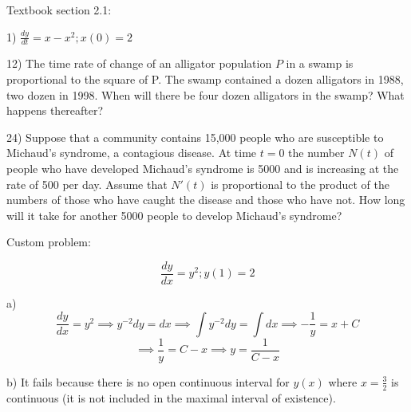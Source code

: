 \documentclass{article}
\begin{document}
Textbook section 2.1:

1) $\frac{dy}{dt} = x - x^2; x(0) = 2$

12) The time rate of change of an alligator population $P$
in a swamp is proportional to the square of P. The swamp
contained a dozen alligators in 1988, two dozen in 1998.
When will there be four dozen alligators in the swamp?
What happens thereafter?

24) Suppose that a community contains 15,000 people who are
susceptible to Michaud's syndrome, a contagious disease. At
time $t = 0$ the number $N(t)$ of people who have developed
Michaud's syndrome is 5000 and is increasing at the rate of 500
per day. Assume that $N'(t)$ is proportional to the product
of the numbers of those who have caught the disease and those
who have not. How long will it take for another 5000
people to develop Michaud's syndrome?


Custom problem:

\[\frac{dy}{dx} = y^2; y(1) = 2\]

a)
\[\frac{dy}{dx} = y^2
\implies y^{-2}dy = dx
\implies \int y^{-2} dy = \int dx
\implies -\frac{1}{y} = x + C\]
\[\implies \frac{1}{y} = C - x
\implies y = \frac{1}{C-x}\]

b) It fails because there is no open
continuous interval for $y(x)$ where $x = \frac{3}{2}$ is continuous
(it is not included in the maximal interval of existence).
\end{document}
